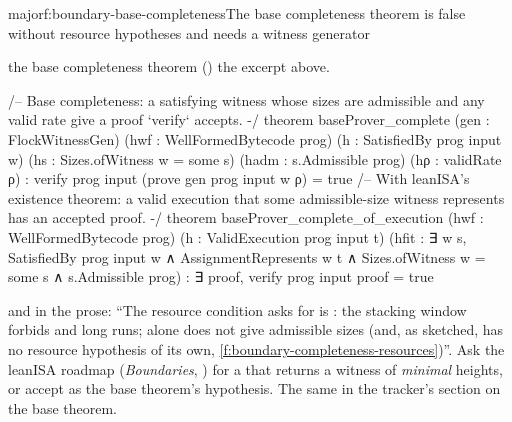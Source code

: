 \begin{finding}{major}{f:boundary-base-completeness}{The base completeness theorem is false without resource hypotheses and needs a witness generator}
\begin{change}{the base completeness theorem ()}
\asis the excerpt above.
\asproposed
\begin{leancode}
/-- Base completeness: a satisfying witness whose sizes are admissible and any valid rate give
a proof `verify` accepts. -/
theorem baseProver_complete (gen : FlockWitnessGen) (hwf : WellFormedBytecode prog)
    (h : SatisfiedBy prog input w) (hs : Sizes.ofWitness w = some s) (hadm : s.Admissible prog)
    (hρ : validRate ρ) : verify prog input (prove gen prog input w ρ) = true
/-- With leanISA's existence theorem: a valid execution that some admissible-size witness
represents has an accepted proof. -/
theorem baseProver_complete_of_execution (hwf : WellFormedBytecode prog)
    (h : ValidExecution prog input t)
    (hfit : ∃ w s, SatisfiedBy prog input w ∧ AssignmentRepresents w t ∧
      Sizes.ofWitness w = some s ∧ s.Admissible prog) : ∃ proof, verify prog input proof = true
\end{leancode}
and in the prose: \enquote{The resource condition  asks for is
: the stacking window forbids  and long runs; 
alone does not give admissible sizes (and, as sketched, has no resource hypothesis of its own,
\cref{f:boundary-completeness-resources})}. Ask the leanISA roadmap (\emph{Boundaries},
) for a  that returns a witness of \emph{minimal}
heights, or accept  as the base theorem's hypothesis. The same in the tracker's section
on the base theorem.
\end{change}
\end{finding}

